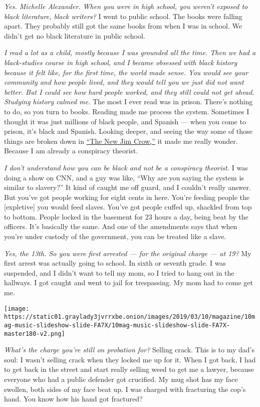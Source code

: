 \emph{Yes. Michelle Alexander. When you were in high school, you weren't
exposed to black literature, black writers?} I went to public school.
The books were falling apart. They probably still got the same books
from when I was in school. We didn't get no black literature in public
school.

\emph{I read a lot as a child, mostly because I was grounded all the
time. Then we had a black-studies course in high school, and I became
obsessed with black history because it felt like, for the first time,
the world made sense. You would see your community and how people lived,
and they would tell you we just did not want better. But I could see how
hard people worked, and they still could not get ahead. Studying history
calmed me.} The most I ever read was in prison. There's nothing to do,
so you turn to books. Reading made me process the system. Sometimes I
thought it was just millions of black people, and Spanish --- when you
come to prison, it's black and Spanish. Looking deeper, and seeing the
way some of those things are broken down in
\href{https://www.nytimes3xbfgragh.onion/2018/01/18/us/new-jim-crow-book-ban-prison.html}{``The
New Jim Crow,''} it made me really wonder. Because I am already a
conspiracy theorist.

\emph{I don't understand how you can be black and not be a conspiracy
theorist.} I was doing a show on CNN, and a guy was like, ``Why are you
saying the system is similar to slavery?'' It kind of caught me off
guard, and I couldn't really answer. But you've got people working for
eight cents in here. You're feeding people the {[}expletive{]} you would
feed slaves. You've got people cuffed up, shackled from top to bottom.
People locked in the basement for 23 hours a day, being beat by the
officers. It's basically the same. And one of the amendments says that
when you're under custody of the government, you can be treated like a
slave.

\emph{Yes, the 13th. So you were first arrested --- for the original
charge --- at 19?} My first arrest was actually going to school. In
sixth or seventh grade. I was suspended, and I didn't want to tell my
mom, so I tried to hang out in the hallways. I got caught and went to
jail for trespassing. My mom had to come get me.

\texttt{[image: https://static01.graylady3jvrrxbe.onion/images/2019/03/10/magazine/10mag-music-slideshow-slide-FA7X/10mag-music-slideshow-slide-FA7X-master180-v2.png]}

\emph{What's the charge you're still on probation for?} Selling crack.
This is to my dad's soul: I wasn't selling crack when they locked me up
for it. When I got back, I had to get back in the street and start
really selling weed to get me a lawyer, because everyone who had a
public defender got crucified. My mug shot has my face swollen, both
sides of my face beat up. I was charged with fracturing the cop's hand.
You know how his hand got fractured?

